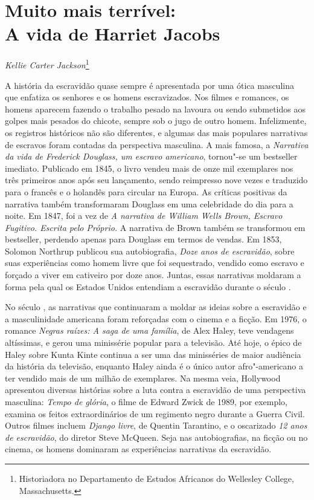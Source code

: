 \chapter*{Muito mais terrível:\\A vida de Harriet Jacobs}

\begin{flushright}
\emph{Kellie Carter Jackson}\footnote{Historiadora no Departamento de
Estudos Africanos do Wellesley College, Massachusetts.}
\end{flushright}

A história da escravidão quase sempre é apresentada por uma ótica
masculina que enfatiza os senhores e os homens escravizados. Nos filmes
e romances, os homens aparecem fazendo o trabalho pesado na lavoura ou
sendo submetidos aos golpes mais pesados do chicote, sempre sob o jugo
de outro homem. Infelizmente, os registros históricos não são
diferentes, e algumas das mais populares narrativas de escravos foram
contadas da perspectiva masculina. A mais famosa, a \emph{Narrativa da
vida de Frederick Douglass, um escravo americano}, tornou"-se um
bestseller imediato. Publicado em 1845, o livro vendeu mais de onze mil
exemplares nos três primeiros anos após seu lançamento, sendo reimpresso
nove vezes e traduzido para o francês e o holandês para circular na
Europa. As críticas positivas da narrativa também transformaram Douglass
em uma celebridade do dia para a noite. Em 1847, foi a vez de \emph{A
narrativa de William Wells Brown, Escravo Fugitivo. Escrita pelo
Próprio.} A narrativa de Brown também se transformou em bestseller,
perdendo apenas para Douglass em termos de vendas. Em 1853, Solomon
Northrup publicou sua autobiografia, \emph{Doze anos de escravidão},
sobre suas experiências como homem livre que foi sequestrado, vendido
como escravo e forçado a viver em cativeiro por doze anos. Juntas, essas
narrativas moldaram a forma pela qual os Estados Unidos entendiam a escravidão
durante o século .

No século , as narrativas que continuaram a moldar as ideias sobre a
escravidão e a masculinidade americana foram reforçadas com o cinema e a
ficção. Em 1976, o romance \emph{Negras raízes: A saga de uma família},
de Alex Haley, teve vendagens altíssimas, e gerou uma minissérie popular para a
televisão. Até hoje, o épico de Haley sobre Kunta Kinte continua a ser
uma das minisséries de maior audiência da história da televisão,
enquanto Haley ainda é o único autor afro"-americano a ter vendido mais
de um milhão de exemplares. Na mesma veia, Hollywood apresentou diversas
histórias sobre a luta contra a escravidão de uma perspectiva masculina:
\emph{Tempo de glória}, o filme de Edward Zwick de 1989, por exemplo,
examina os feitos extraordinários de um regimento negro durante a Guerra
Civil. Outros filmes incluem \emph{Django livre}, de Quentin Tarantino,
e o oscarizado \emph{12 anos de escravidão}, do diretor Steve McQueen.
Seja nas autobiografias, na ficção ou no cinema, os homens dominaram as
experiências narrativas da escravidão.

